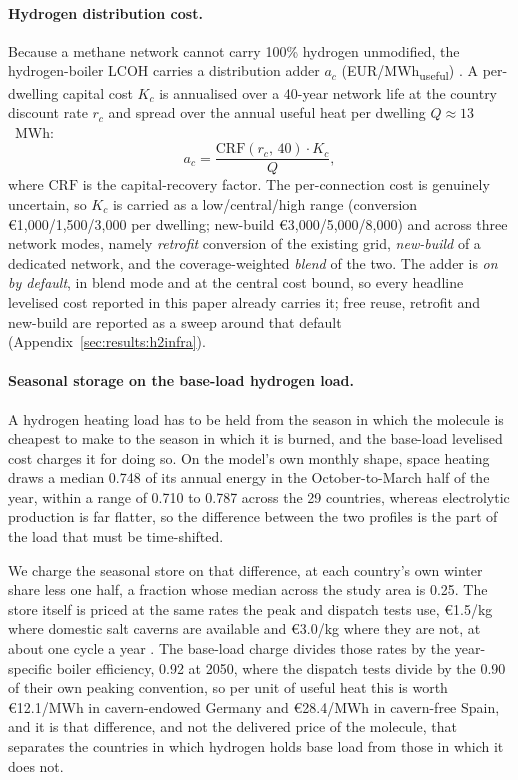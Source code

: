 \paragraph{Hydrogen distribution cost.} Because a methane network cannot carry
100\% hydrogen unmodified, the hydrogen-boiler LCOH carries a distribution adder
$a_c$ (EUR/MWh\textsubscript{useful})
\citep{NorthernGasNetworks2018h21,GasForClimate2020backbone}. A per-dwelling
capital cost $K_c$ is annualised over a 40-year network life at the country
discount rate $r_c$ and spread over the annual useful heat per dwelling
$Q\approx13$~MWh:
\begin{equation}
a_c = \frac{\mathrm{CRF}(r_c,\,40)\cdot K_c}{Q},
\label{eq:h2adder}
\end{equation}
where $\mathrm{CRF}$ is the capital-recovery factor. The per-connection cost is
genuinely uncertain, so $K_c$ is carried as a low/central/high range (conversion
\euro{}1{,}000/1{,}500/3{,}000 per dwelling; new-build \euro{}3{,}000/5{,}000/8{,}000) and
across three network modes, namely \emph{retrofit} conversion of the existing grid,
\emph{new-build} of a dedicated network, and the coverage-weighted \emph{blend} of
the two. The adder is \emph{on by default}, in blend mode and at the central cost
bound, so every headline levelised cost reported in this paper already carries it;
free reuse, retrofit and new-build are reported as a sweep around that default
(Appendix~\ref{sec:results:h2infra}).

\paragraph{Seasonal storage on the base-load hydrogen load.}
\label{sec:method:storageadder} A hydrogen heating load has
to be held from the season in which the molecule is cheapest to make to the season in
which it is burned, and the base-load levelised cost charges it for doing so. On the
model's own monthly shape, space heating draws a median 0.748 of its annual energy in
the October-to-March half of the year, within a range of 0.710 to 0.787 across the 29
countries, whereas electrolytic production is far flatter, so the difference between the
two profiles is the part of the load that must be time-shifted.

We charge the seasonal store on that difference, at each country's own winter share less
one half, a fraction whose median across the study area is 0.25. The store itself is
priced at the same rates the peak and dispatch tests use, \euro{}1.5/kg where domestic
salt caverns are available and \euro{}3.0/kg where they are not, at about one cycle a
year \citep{Caglayan2020caverns}. The base-load charge divides those rates by the
year-specific boiler efficiency, 0.92 at 2050, where the dispatch tests divide by the
0.90 of their own peaking convention, so per unit of useful heat this is worth
\euro{}12.1/MWh in cavern-endowed Germany and \euro{}28.4/MWh in cavern-free Spain, and it is that
difference, and not the delivered price of the molecule, that separates the countries
in which hydrogen holds base load from those in which it does not.

